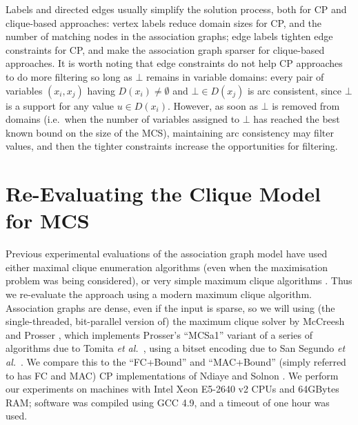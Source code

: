 \documentclass{llncs}
\begin{document}
Labels and directed edges usually simplify the solution process, both for CP and clique-based
approaches: vertex labels reduce domain sizes for CP, and the number of matching nodes in the
association graphs; edge labels tighten edge constraints for CP, and make the association graph
sparser for clique-based approaches. It is worth noting that edge constraints do not help CP
approaches to do more filtering so long as $\bot$ remains in variable domains: every pair of
variables $(x_i, x_j)$ having  $D(x_i) \neq \emptyset$ and $\bot \in D(x_j)$ is arc consistent,
since $\bot$ is a support for any value $u \in D(x_i)$. However, as soon as $\bot$ is removed from
domains (i.e.\ when the number of variables assigned to $\bot$ has reached the best known bound on
the size of the MCS), maintaining arc consistency may filter values, and then the tighter constraints
increase the opportunities for filtering.

\section{Re-Evaluating the Clique Model for MCS}\label{eval1}

Previous experimental evaluations of the association graph model have used either maximal clique
enumeration algorithms \cite{DBLP:journals/tcs/Koch01,DBLP:conf/mco/VismaraV08} (even when the
maximisation problem was being considered), or very simple maximum clique algorithms
\cite{DBLP:conf/sspr/BunkeFGSV02,DBLP:journals/jgaa/ConteFV07}. Thus we re-evaluate the approach
using a modern maximum clique algorithm. Association graphs are dense, even if the input is sparse,
so we will using (the single-threaded, bit-parallel version of) the maximum clique solver by
McCreesh and Prosser \cite{DBLP:journals/topc/McCreeshP15}, which implements Prosser's
\cite{DBLP:journals/algorithms/Prosser12} ``MCSa1'' variant of a series of algorithms due to Tomita
\textit{et al.}\
\cite{DBLP:conf/dmtcs/TomitaS03,DBLP:journals/jgo/TomitaK07,DBLP:conf/walcom/TomitaSHTW10}, using a
bitset encoding due to San Segundo \textit{et al.}\
\cite{DBLP:journals/cor/SegundoRJ11,DBLP:journals/ol/SegundoMRH13}. We compare this to the
``FC+Bound'' and ``MAC+Bound'' (simply referred to has FC and MAC) CP implementations of Ndiaye and
Solnon \cite{DBLP:conf/cp/NdiayeS11}.  We perform our experiments on machines with Intel Xeon
E5-2640 v2 CPUs and 64GBytes RAM; software was compiled using GCC 4.9, and a timeout of one hour was
used.
\end{document}
